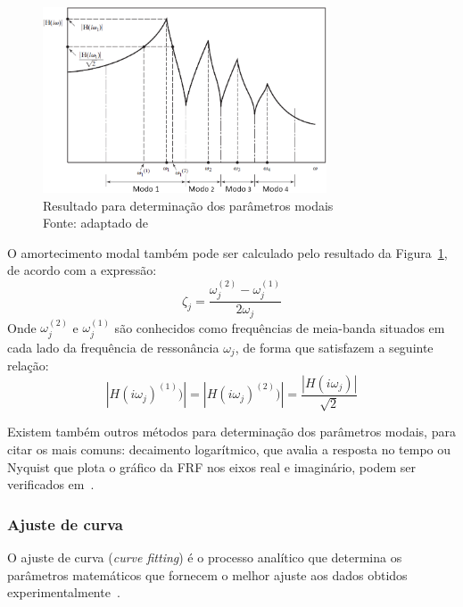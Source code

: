 \begin{figure}[h]
	\centering 
 	\includegraphics[width=0.75\textwidth]{figs/tipical_frf}
 	\caption[Resultado para determinação dos parâmetros modais]{Resultado para
 	determinação dos parâmetros modais \\ Fonte: adaptado de
 	\cite{rao2011mechanical}}
 	\label{fig::tipical_frf}
\end{figure}

O amortecimento modal também pode ser calculado pelo resultado da
Figura~\ref{fig::tipical_frf}, de acordo com a expressão:
%
\begin{equation}
	\zeta_j = \frac{\omega_j^{(2)} - \omega_j^{(1)}}{2 \omega_j}
\end{equation}
%
Onde $\omega_j^{(2)}$ e $\omega_j^{(1)}$ são conhecidos como frequências de
meia-banda situados em cada lado da frequência de ressonância $\omega_j$, de
forma que satisfazem a seguinte relação:
%
\begin{equation}
	\left | H(i\omega_j)^{(1)}) \right | = \left | H(i\omega_j)^{(2)}) \right | =
	\frac{\left | H(i\omega_j) \right |}{\sqrt{2}}
\end{equation}

Existem também outros métodos para determinação dos parâmetros modais, para
citar os mais comuns:
decaimento logarítmico, que avalia a resposta no tempo ou Nyquist que plota o
gráfico da FRF nos eixos real e imaginário, podem ser
verificados em~\cite{rao2011mechanical}.

\subsubsection{Ajuste de curva}

O ajuste de curva (\textit{curve fitting}) é o processo analítico que determina
os parâmetros matemáticos que fornecem o melhor ajuste aos dados
obtidos experimentalmente~\cite{dossing1988structural}.

